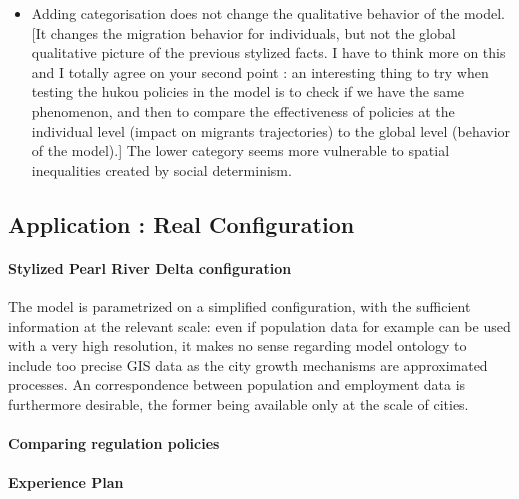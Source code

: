 \begin{itemize}
\item Adding categorisation does not change the qualitative behavior of the model. [It changes the migration behavior for individuals, but not the global qualitative picture of the previous stylized facts. I have to think more on this and I totally agree on your second point : an interesting thing to try when testing the hukou policies in the model is to check if we have the same phenomenon, and then to compare the effectiveness of policies at the individual level (impact on migrants trajectories) to the global level (behavior of the model).] The lower category seems more vulnerable to spatial inequalities created by social determinism.
\end{itemize}





\subsection{Application : Real Configuration}



\paragraph{Stylized Pearl River Delta configuration}

The model is parametrized on a simplified configuration, with the sufficient information at the relevant scale: even if population data for example can be used with a very high resolution, it makes no sense regarding model ontology to include too precise GIS data as the city growth mechanisms are approximated processes. An correspondence between population and employment data is furthermore desirable, the former being available only at the scale of cities.


\paragraph{Comparing regulation policies}



\paragraph{Experience Plan}

